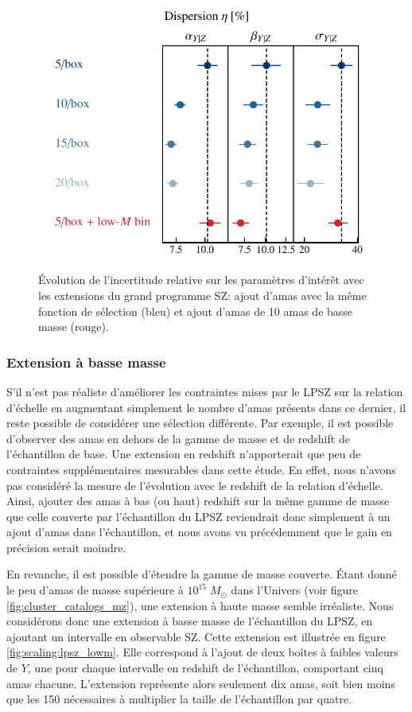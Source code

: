 \begin{figure}[t]
    \centering
    \includegraphics[width=.6\linewidth]{Figures/Chap_scaling/eta_ext.pdf}
    \caption{
        Évolution de l'incertitude relative sur les paramètres d'intérêt avec les extensions du grand programme SZ: ajout d'amas avec la même fonction de sélection (bleu) et ajout d'amas de 10 amas de basse masse (rouge).
    }
    \label{fig:scaling:eta_ext}
\end{figure}

\subsubsection{Extension à basse masse} %

S'il n'est pas réaliste d'améliorer les contraintes mises par le LPSZ sur la relation d'échelle en augmentant simplement le nombre d'amas présents dans ce dernier, il reste possible de considérer une sélection différente.
Par exemple, il est possible d'observer des amas en dehors de la gamme de masse et de redshift de l'échantillon de base.
Une extension en redshift n'apporterait que peu de contraintes supplémentaires mesurables dans cette étude.
En effet, nous n'avons pas considéré la mesure de l'évolution avec le redshift de la relation d'échelle.
Ainsi, ajouter des amas à bas (ou haut) redshift sur la même gamme de masse que celle couverte par l'échantillon du LPSZ reviendrait donc simplement à un ajout d'amas dans l'échantillon, et nous avons vu précédemment que le gain en précision serait moindre.

En revanche, il est possible d'étendre la gamme de masse couverte.
Étant donné le peu d'amas de masse supérieure à $10^{15} \; M_\odot$ dans l'Univers (voir figure \ref{fig:cluster_catalogs_mz}), une extension à haute masse semble irréaliste.
Nous considérons donc une extension à basse masse de l'échantillon du LPSZ, en ajoutant un intervalle en observable SZ.
Cette extension est illustrée en figure \ref{fig:scaling:lpsz_lowm}.
Elle correspond à l'ajout de deux boîtes à faibles valeurs de $Y$, une pour chaque intervalle en redshift de l'échantillon, comportant cinq amas chacune.
L'extension représente alors seulement dix amas, soit bien moins que les 150 nécessaires à multiplier la taille de l'échantillon par quatre.

